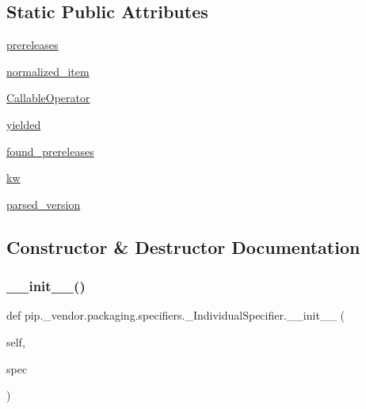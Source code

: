 \subsection*{Static Public Attributes}
\begin{DoxyCompactItemize}
\item 
\hyperlink{classpip_1_1__vendor_1_1packaging_1_1specifiers_1_1__IndividualSpecifier_a5c2309c76870279ea60346f4eb3ce846}{prereleases}
\item 
\hyperlink{classpip_1_1__vendor_1_1packaging_1_1specifiers_1_1__IndividualSpecifier_a6026e962d3d9a2bf330e4f404cacb68c}{normalized\+\_\+item}
\item 
\hyperlink{classpip_1_1__vendor_1_1packaging_1_1specifiers_1_1__IndividualSpecifier_a96c9fb32b80df7ac6ee0f227b8eadeb9}{Callable\+Operator}
\item 
\hyperlink{classpip_1_1__vendor_1_1packaging_1_1specifiers_1_1__IndividualSpecifier_a842a966349e5c985643cc5e70e648b71}{yielded}
\item 
\hyperlink{classpip_1_1__vendor_1_1packaging_1_1specifiers_1_1__IndividualSpecifier_ae8cb253c340492ed34d8995e9272e006}{found\+\_\+prereleases}
\item 
\hyperlink{classpip_1_1__vendor_1_1packaging_1_1specifiers_1_1__IndividualSpecifier_aeae76a7f754f37a95df1d4d09210cbb6}{kw}
\item 
\hyperlink{classpip_1_1__vendor_1_1packaging_1_1specifiers_1_1__IndividualSpecifier_ad978297ae04c3f6accc15c6d280a305a}{parsed\+\_\+version}
\end{DoxyCompactItemize}


\subsection{Constructor \& Destructor Documentation}
\mbox{\label{classpip_1_1__vendor_1_1packaging_1_1specifiers_1_1__IndividualSpecifier_af9c381845531298e8d3d38f9985eeac6}} 
\subsubsection{\texorpdfstring{\+\_\+\+\_\+init\+\_\+\+\_\+()}{\_\_init\_\_()}}
{\footnotesize\ttfamily def pip.\+\_\+vendor.\+packaging.\+specifiers.\+\_\+\+Individual\+Specifier.\+\_\+\+\_\+init\+\_\+\+\_\+ (\begin{DoxyParamCaption}\item[{}]{self,  }\item[{}]{spec }\end{DoxyParamCaption})}



